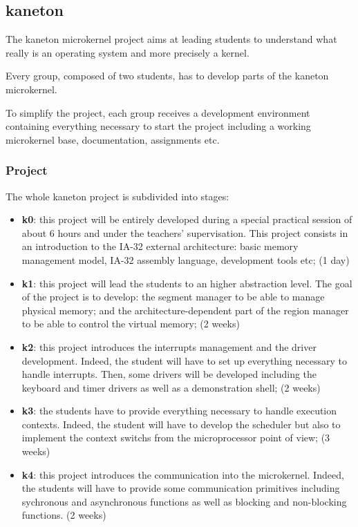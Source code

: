 \begin{multicols}{2}
%
%

\subsection{kaneton}

The kaneton microkernel project aims at leading students to understand
what really is an operating system and more precisely a kernel.

Every group, composed of two students, has to develop parts of the kaneton
microkernel.

To simplify the project, each group receives a development environment
containing everything necessary to start the project including a
working microkernel base, documentation, assignments etc.


\subsubsection{Project}

The whole kaneton project is subdivided into stages:

\begin{itemize}
  \item
    \textbf{k0}: this project will be entirely developed during a
    special practical session of about 6 hours and under the teachers'
    supervisation. This project consists in an introduction to the
    IA-32 external architecture: basic memory management model,
    IA-32 assembly language, development tools etc; (1 day)
  \item
    \textbf{k1}: this project will lead the students to an higher abstraction
    level. The goal of the project is to develop: the segment manager to be
    able to manage physical memory; and the architecture-dependent part of the
    region manager to be able to control the virtual memory; (2 weeks)
  \item
    \textbf{k2}: this project introduces the interrupts management and
    the driver development. Indeed, the student will have to set up
    everything necessary to handle interrupts. Then, some drivers will
    be developed including the keyboard and timer drivers as well as a
    demonstration shell; (2 weeks)
  \item
    \textbf{k3}: the students have to provide everything necessary
    to handle execution contexts. Indeed, the student will have to
    develop the scheduler but also to implement the context switchs from
    the microprocessor point of view; (3 weeks)
  \item
    \textbf{k4}: this project introduces the communication into the
    microkernel. Indeed, the students will have to provide some
    communication primitives including sychronous and asynchronous
    functions as well as blocking and non-blocking functions. (2 weeks)
\end{itemize}


\end{multicols}
